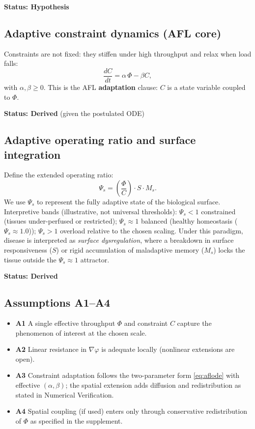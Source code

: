 \documentclass[11pt]{article}
\begin{document}
\textbf{Status: Hypothesis}

\subsection{Adaptive constraint dynamics (AFL core)}
Constraints are not fixed: they stiffen under high throughput and relax when load falls:
\begin{equation}
  \frac{dC}{dt} = \alpha \,\Phi - \beta C,
  \label{eq:aflode}
\end{equation}
with $\alpha,\beta\ge 0$. This is the AFL \textbf{adaptation} clause: $C$ is a state variable coupled to $\Phi$.

\textbf{Status: Derived} (given the postulated ODE)

\subsection{Adaptive operating ratio and surface integration}
Define the extended operating ratio:
\begin{equation}
  \Psi_s = \left(\frac{\Phi}{C}\right) \cdot S \cdot M_s.
\end{equation}
We use $\Psi_s$ to represent the fully adaptive state of the biological surface. Interpretive bands (illustrative, not universal thresholds): $\Psi_s<1$ constrained (tissues under-perfused or restricted); $\Psi_s\approx 1$ balanced (healthy homeostasis ($\Psi_s \approx 1.0$)); $\Psi_s>1$ overload relative to the chosen scaling. Under this paradigm, disease is interpreted as \emph{surface dysregulation}, where a breakdown in surface responsiveness ($S$) or rigid accumulation of maladaptive memory ($M_s$) locks the tissue outside the $\Psi_s \approx 1$ attractor.

\textbf{Status: Derived}

\subsection{Assumptions A1--A4}
\begin{itemize}
  \item \textbf{A1} A single effective throughput $\Phi$ and constraint $C$ capture the phenomenon of interest at the chosen scale.
  \item \textbf{A2} Linear resistance in $\nabla\varphi$ is adequate locally (nonlinear extensions are open).
  \item \textbf{A3} Constraint adaptation follows the two-parameter form \eqref{eq:aflode} with effective $(\alpha,\beta)$; the spatial extension adds diffusion and redistribution as stated in Numerical Verification.
  \item \textbf{A4} Spatial coupling (if used) enters only through conservative redistribution of $\Phi$ as specified in the supplement.
\end{itemize}
\end{document}

